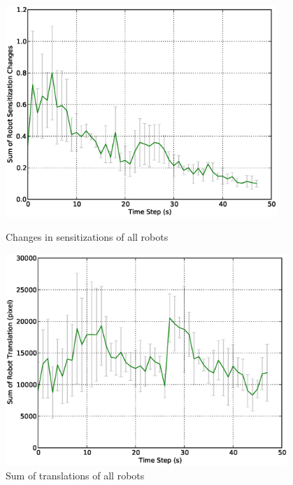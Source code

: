 \documentclass{llncs}
\begin{document}
\begin{figure}
\centering
\includegraphics[height=8cm, angle=0]
{images/global/RobotSensitizationStat-Total-50steps.eps}
\caption{\small Changes in sensitizations of all robots}
\label{fig:sensitization-stat} %
\centering
\includegraphics[height=8cm, angle=0]{images/global/DeltaTranslationStat.eps}
\caption{\small Sum of translations of all robots }
\label{fig:translation-stat} %
\end{figure}
\end{document}
